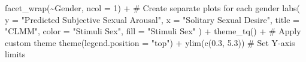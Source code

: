 \documentclass[
  bookmarksnumbered]{article}
\newenvironment{Shaded}{\begin{snugshade}}{\end{snugshade}}
\newcommand{\AttributeTok}[1]{\textcolor[rgb]{0.80,0.80,0.80}{#1}}
\newcommand{\CommentTok}[1]{\textcolor[rgb]{0.50,0.62,0.50}{#1}}
\newcommand{\DecValTok}[1]{\textcolor[rgb]{0.86,0.86,0.80}{#1}}
\newcommand{\FloatTok}[1]{\textcolor[rgb]{0.75,0.75,0.82}{#1}}
\newcommand{\FunctionTok}[1]{\textcolor[rgb]{0.94,0.94,0.56}{#1}}
\newcommand{\NormalTok}[1]{\textcolor[rgb]{0.80,0.80,0.80}{#1}}
\newcommand{\SpecialCharTok}[1]{\textcolor[rgb]{0.86,0.64,0.64}{#1}}
\newcommand{\StringTok}[1]{\textcolor[rgb]{0.80,0.58,0.58}{#1}}
\begin{document}
\begin{Shaded}
\begin{Highlighting}[]
  \FunctionTok{facet\_wrap}\NormalTok{(}\SpecialCharTok{\textasciitilde{}}\NormalTok{Gender, }\AttributeTok{ncol =} \DecValTok{1}\NormalTok{) }\SpecialCharTok{+} \CommentTok{\# Create separate plots for each gender}
  \FunctionTok{labs}\NormalTok{(}
    \AttributeTok{y =} \StringTok{"Predicted Subjective Sexual Arousal"}\NormalTok{, }\AttributeTok{x =} \StringTok{"Solitary Sexual Desire"}\NormalTok{,}
    \AttributeTok{title =} \StringTok{"CLMM"}\NormalTok{,}
    \AttributeTok{color =} \StringTok{"Stimuli Sex"}\NormalTok{, }\AttributeTok{fill =} \StringTok{"Stimuli Sex"}
\NormalTok{  ) }\SpecialCharTok{+}
  \FunctionTok{theme\_tq}\NormalTok{() }\SpecialCharTok{+} \CommentTok{\# Apply custom theme}
  \FunctionTok{theme}\NormalTok{(}\AttributeTok{legend.position =} \StringTok{"top"}\NormalTok{) }\SpecialCharTok{+}
  \FunctionTok{ylim}\NormalTok{(}\FunctionTok{c}\NormalTok{(}\FloatTok{0.3}\NormalTok{, }\FloatTok{5.3}\NormalTok{)) }\CommentTok{\# Set Y{-}axis limits}


\end{Highlighting}
\end{Shaded}
\end{document}
